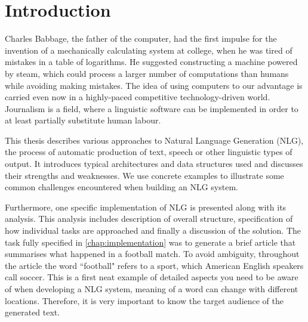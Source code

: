\chapter*{Introduction}

Charles Babbage, the father of the computer, had the first impulse for the invention of a mechanically calculating system at college, when he was tired of mistakes in a table of logarithms. He suggested constructing a machine powered by steam, which could process a larger number of computations than humans while avoiding making mistakes. The idea of using computers to our advantage is carried even now in a highly-paced competitive technology-driven world. Journalism is a field, where a linguistic software can be implemented in order to at least partially substitute human labour.

This thesis describes various approaches to Natural Language Generation (NLG), the process of automatic production of text, speech or other linguistic types of output. It introduces typical architectures and data structures used and discusses their strengths and weaknesses. We use concrete examples to illustrate some common challenges encountered when building an NLG system.

Furthermore, one specific implementation of NLG is presented along with its analysis. This analysis includes description of overall structure, specification of how individual tasks are approached and finally a discussion of the solution. The task fully specified in \autoref{chap:implementation} was to generate a brief article that summarises what happened in a football match. To avoid ambiguity, throughout the article the word ``football" refers to a sport, which American English speakers call soccer. This is a first neat example of detailed aspects you need to be aware of when developing a NLG system, meaning of a word can change with different locations. Therefore, it is very important to know the target audience of the generated text. 



